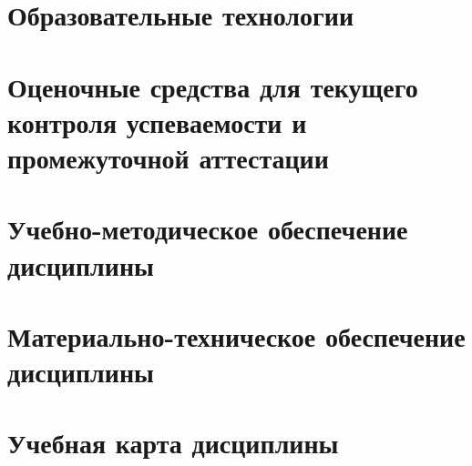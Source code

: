 

\section{Образовательные технологии}

\section{Оценочные средства для текущего контроля успеваемости и промежуточной аттестации}

\section{Учебно-методическое обеспечение дисциплины}





\section{Материально-техническое обеспечение дисциплины}
	



\section{Учебная карта дисциплины}

